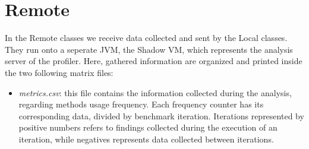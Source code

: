 \documentclass[]{usiinfthesis}
\begin{document}
\section{Remote}
In the Remote classes we receive data collected and sent by the Local classes. They run onto a seperate JVM, the Shadow VM, which represents the analysis server of the profiler. Here, gathered information are organized and printed inside the two following matrix files:
\begin{itemize}
    \item \textit{metrics.csv}: this file contains the information collected during the analysis, regarding methods usage frequency. Each frequency counter has its corresponding data, divided by benchmark iteration. Iterations represented by positive numbers refers to findings collected during the execution of an iteration, while negatives represents data collected between iterations.
    

\end{itemize}
\end{document}
